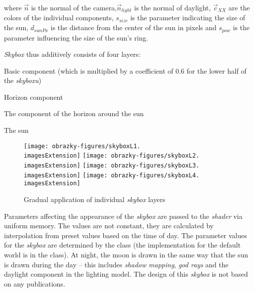 where $\vec{n}$ is the normal of the camera,$\vec{n}_{light}$ is the normal of daylight, $\vec{c}_{XX}$ are the colors of the individual components, $s_{size}$ is the parameter indicating the size of the sun, $d_{sunPx}$ is the distance from the center of the sun in pixels and $s_{pow}$ is the parameter influencing the size of the sun's ring.

\textit{Skybox} thus additively consists of four layers:
\begin{compactenum}
	\item Basic component (which is multiplied by a coefficient of $0.6$ for the lower half of the \textit{skyboxu})
	\item Horizon component
	\item The component of the horizon around the sun
	\item The sun
\end{compactenum}

\begin{figure}[H]
	\texttt{[image: obrazky-figures/skyboxL1.\\imagesExtension]}
	\hfill
	\texttt{[image: obrazky-figures/skyboxL2.\\imagesExtension]}
	\hfill
	\texttt{[image: obrazky-figures/skyboxL3.\\imagesExtension]}
	\hfill
	\texttt{[image: obrazky-figures/skyboxL4.\\imagesExtension]}
	\caption{Gradual application of individual \textit{skybox} layers}
\end{figure}

Parameters affecting the appearance of the \textit{skybox} are passed to the \textit{shader} via uniform memory. The values are not constant, they are calculated by interpolation from preset values based on the time of day. The parameter values for the \textit{skybox} are determined by the  class (the implementation for the default world is in the  class). At night, the moon is drawn in the same way that the sun is drawn during the day -- this includes \textit{shadow mapping}, \textit{god rays} and the daylight component in the lighting model. The design of this \textit{skybox} is not based on any publications.


\vfill


